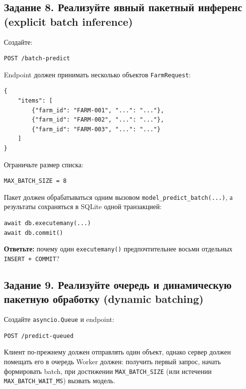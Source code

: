 \documentclass[12pt,a4paper]{article}
\begin{document}
\subsection{Задание 8. Реализуйте явный пакетный инференс (explicit batch inference)}

Создайте:

\begin{lstlisting}[caption={Explicit batch endpoint}]
POST /batch-predict
\end{lstlisting}

Endpoint должен принимать несколько объектов \texttt{FarmRequest}:

\begin{lstlisting}[caption={Тело batch-запроса}]
{
    "items": [
        {"farm_id": "FARM-001", "...": "..."},
        {"farm_id": "FARM-002", "...": "..."},
        {"farm_id": "FARM-003", "...": "..."}
    ]
}
\end{lstlisting}

Ограничьте размер списка:

\begin{lstlisting}[caption={Ограничение размера batch}]
MAX_BATCH_SIZE = 8
\end{lstlisting}

Пакет должен обрабатываться одним вызовом \texttt{model\_predict\_batch(...)}, а результаты сохраняться в SQLite одной транзакцией:

\begin{lstlisting}[caption={Пакетное сохранение}]
await db.executemany(...)
await db.commit()
\end{lstlisting}

\textbf{Ответьте:} почему один \texttt{executemany()} предпочтительнее восьми отдельных \texttt{INSERT + COMMIT}?

\subsection{Задание 9. Реализуйте очередь и динамическую пакетную обработку (dynamic batching)}

Создайте \texttt{asyncio.Queue} и endpoint:

\begin{lstlisting}[caption={Dynamic batching endpoint}]
POST /predict-queued
\end{lstlisting}

Клиент по-прежнему должен отправлять один объект, однако сервер должен помещать его в очередь
Worker должен: получить первый запрос, начать формировать batch, при достижении \texttt{MAX\_BATCH\_SIZE} (или истечении \texttt{MAX\_BATCH\_WAIT\_MS}) вызвать модель.
\end{document}
